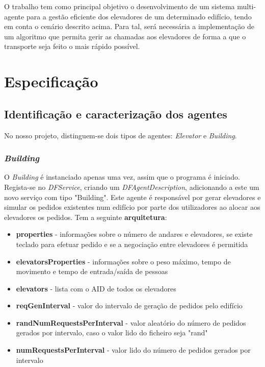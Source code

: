 ﻿\documentclass[a4paper]{article}
\begin{document}
O trabalho tem como principal objetivo o desenvolvimento de um sistema multi-agente para a gestão eficiente dos elevadores de um determinado edifício, tendo em conta o cenário descrito acima. Para tal, será necessária a implementação de um algoritmo que permita gerir as chamadas aos elevadores de forma a que o transporte seja feito o mais rápido possível.

\newpage

\section{Especificação}

\subsection{Identificação e caracterização dos agentes} 

No nosso projeto, distinguem-se dois tipos de agentes: \textit{Elevator} e \textit{Building}.

\subsubsection {\textit{Building}}

O \textit{Building} é instanciado apenas uma vez, assim que o programa é iniciado. Regista-se no \textit{DFService}, criando um \textit{DFAgentDescription}, adicionando a este um novo serviço com tipo "Building". Este agente é responsável por gerar elevadores e simular os pedidos existentes num edifício por parte dos utilizadores ao alocar aos elevadores os pedidos. Tem a seguinte \textbf{arquitetura}:

\begin{itemize}
\item \textbf{properties} - informações sobre o número de andares e elevadores, se existe teclado para efetuar pedido e se a negociação entre elevadores é permitida
\item \textbf{elevatorsProperties} - informações sobre o peso máximo, tempo de movimento e tempo de entrada/saída de pessoas
\item \textbf{elevators} - lista com o AID de todos os elevadores
\item \textbf{reqGenInterval} - valor do intervalo de geração de pedidos pelo edifício
\item \textbf{randNumRequestsPerInterval} - valor aleatório do número de pedidos gerados por intervalo, caso o valor lido do ficheiro seja "rand"
\item \textbf{numRequestsPerInterval} - valor lido do número de pedidos gerados por intervalo
\end{itemize}
\end{document}
